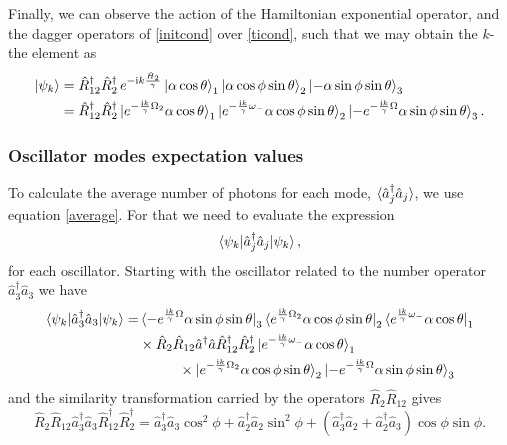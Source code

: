\documentclass{article}
\newcommand{\mi}{\mathrm{i}}
\newcommand{\op}[1]{\hat{#1}}
\begin{document}
Finally, we can observe the action of the Hamiltonian exponential operator, and the dagger operators of \eqref{initcond} over \eqref{ticond}, such that we may obtain the $k$-the element as
 \begin{align*}
    \ket{\psi_{k}} &= \op{R}_{12}^{\dagger}\op{R}_{2}^{\dagger}\,e^{-\mi k\frac{\op{H}_{2}}{\gamma}}\ket{\alpha\cos\theta}_{1}\ket{\alpha\cos\phi\sin\theta}_{2}\ket{-\alpha\sin\phi\sin\theta}_{3}\\
    &= \op{R}_{12}^{\dagger}\op{R}_{2}^{\dagger}\ket{e^{-\frac{\mi k}{\gamma}\Omega_{2}}\alpha\cos\theta}_{1}\ket{e^{-\frac{\mi k}{\gamma}\omega_{-}}\alpha\cos\phi\sin\theta}_{2}\ket{-e^{-\frac{\mi k}{\gamma}\Omega}\alpha\sin\phi\sin\theta}_{3}.
\end{align*} 


\subsubsection*{Oscillator modes expectation values}
To calculate the average number of photons for each mode,  $\braket{\op{a}_{j}^{\dagger}\op{a}_{j}}$, we use equation \eqref{average}. For that we need to evaluate the expression 
\begin{equation*}
    \braket{\psi_{k}|\op{a}_{j}^{\dagger}\op{a}_{j}|\psi_{k}},
\end{equation*}
for each oscillator. Starting with the oscillator related to the number operator $\op{a}_{3}^{\dagger}\op{a}_{3}$ we have
\begin{equation}\label{photons0}
\begin{aligned}
    \braket{\psi_{k}|\op{a}_{3}^{\dagger}\op{a}_{3}|\psi_{k}} = &\bra{-e^{\frac{\mi k}{\gamma}\Omega}\alpha\sin\phi\sin\theta}_{3}\bra{e^{\frac{\mi k}{\gamma}\Omega_{2}}\alpha\cos\phi\sin\theta}_{2}\bra{e^{\frac{\mi k}{\gamma}\omega_{-}}\alpha\cos\theta}_{1}\\ &\times \op{R}_{2}\op{R}_{12}\op{a}^{\dagger}\op{a}  \op{R}_{12}^{\dagger}\op{R}_{2}^{\dagger}\ket{e^{-\frac{\mi k}{\gamma}\omega_{-}}\alpha\cos\theta}_{1}\\ &\hspace{1cm}\times \ket{e^{-\frac{\mi k}{\gamma}\Omega_{2}}\alpha\cos\phi\sin\theta}_{2}\ket{-e^{-\frac{\mi k}{\gamma}\Omega}\alpha\sin\phi\sin\theta}_{3}
\end{aligned}
\end{equation}
and the similarity transformation carried by the operators $\op{R}_{2}\op{R}_{12}$ gives
\begin{equation}\label{ph00r}
    \op{R}_{2}\op{R}_{12}\op{a}_{3}^{\dagger}\op{a}_{3}  \op{R}_{12}^{\dagger}\op{R}_{2}^{\dagger}=\op{a}_{3}^{\dagger}\op{a}_{3}\cos^2\phi+\op{a}_2^{\dagger}\op{a}_2\sin^2\phi+(\op{a}_{3}^{\dagger}\op{a}_{2}+\op{a}_2^{\dagger}\op{a}_{3})\cos\phi\sin\phi.
\end{equation}
\end{document}
